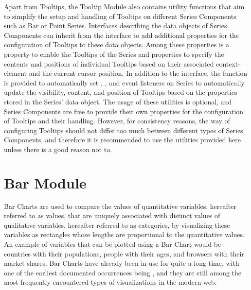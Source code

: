 Apart from Tooltips, the Tooltip Module also contains utility
functions that aim to simplify the setup and handling of Tooltips on
different Series Components such as Bar or Point Series.  Interfaces
describing the data objects of Series Components can inherit from the
 interface to add additional properties for
the configuration of Tooltips to these data objects.  Among these
properties is a property to enable the Tooltips of the Series and
properties to specify the contents and positions of individual
Tooltips based on their associated context-element and the current
cursor position.  In addition to the 
interface, the  function is
provided to automatically set , , and
 event listeners on Series to automatically update the
visibility, content, and position of Tooltips based on the
 properties stored in the Series' data
object.  The usage of these utilities is optional, and Series
Components are free to provide their own properties for the
configuration of Tooltips and their handling.  However, for
consistency reasons, the way of configuring Tooltips should not differ
too much between different types of Series Components, and therefore
it is recommended to use the utilities provided here unless there is a
good reason not to.





\section{Bar Module}

Bar Charts are used to compare the values of quantitative variables,
hereafter referred to as values, that are uniquely associated with
distinct values of qualitative variables, hereafter referred to as
categories, by visualizing these variables as rectangles whose lengths
are proportional to the quantitative values.  An example of variables
that can be plotted using a Bar Chart would be countries with their
populations, people with their ages, and browsers with their market
shares.  Bar Charts have already been in use for quite a long time,
with one of the earliest documented occurrences being
\textcite{CommercialAndPoliticalAtlas}, and they are still among the
most frequently encountered types of visualizations in the modern web.

